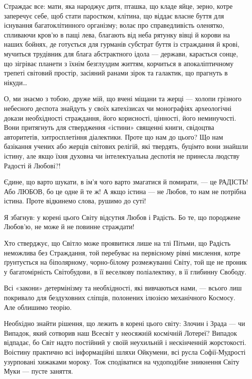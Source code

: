 Страждає все: мати, яка народжує дитя, пташка, що кладе яйце, зерно, котре
заперечує себе, щоб стати паростком, клітина, що віддає власне буття для
існування багатоклітинного організму; волає про справедливість оленятко,
спливаючи кров’ю в пащі лева, благають від неба рятунку вівці й корови на наших
бойнях, де готується для гурманів субстрат буття із страждання й крові,
мучиться трудівник для блага абстрактного ідола — держави, карається сонце, що
зігріває планети з їхнім безглуздим життям, корчиться в апокаліптичному трепеті
світовий простір, засіяний ранами зірок та галактик, що прагнуть в нікуди…

О, ми знаємо з тобою, друже мій, що вчені міщани та жерці — холопи грізного
небесного деспота знайдуть у своїх катехізисах чи монографіях археологічні
докази необхідності страждання, його корисності, цінності, його неминучості.
Вони притягнуть для ствердження «істини» священні книги, свідоцтва авторитетів,
хитросплетіння діалектики. Проте що нам до цього? Що нам базікання учених або
жерців світових релігій, які твердять, буцімто вони знайшли істину, але якщо
їхня духовна чи інтелектуальна деспотія не принесла людству Радості й Любові?!

Єдине, що варто шукати, в ім’я чого варто змагатися й помирати, — це РАДІСТЬ! Або ЛЮБОВ, бо це одне й те ж! А якщо істина — не Любов, то нам не потрібна істина. Проте відкинемо слова, рушимо до суті!

Я збагнув: у корені цього Світу відсутня Любов і Радість. Бо те, що породжене Любов’ю, не може й не повинне страждати!

Хто стверджує, що Світло може проявитися лише на тлі Пітьми, що Радість неможлива без Страждання, той перебуває на первісному рівні мислення, котре ґрунтується на біполярному, чорно-білому розмежуванні Світу, той ще не проник у багатомірність Світобудови, в її веселкову поліалектику, в її глибинну Свободу.

Всі «закони» детермінізму та необхідності, які вивчаються нами, — всього лиш покривало для бездуховних сліпців, полонених ілюзією механічного Космосу. Але облишимо теорію.

Необхідно знайти рішення, що лежить в корені цього світу: Злочин і Зрада — чи Випадок, який сотворив наш Всесвіт у неосяжній космічній Лотереї? Випадок відпадає, бо Світ надто постійний у своїй неухильній і нескінченній жорстокості. Воістину практично всі інформаційні шляхи Ойкумени, всі русла Софії-Мудрості узурповані хижаками мороку. Тож сподіватися на чудоподібне зникнення Світу Муки — пусте заняття.

